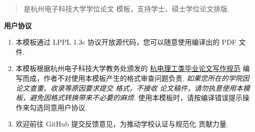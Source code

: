 \begin{abstract}
   是杭州电子科技大学学位论文  模板，支持学士、硕士学位论文排版.
\end{abstract}

\begin{center}
  \small\bfseries 用户协议
\end{center}
\begin{enumerate} [ itemsep = 0pt ] \small
  \item 本模板通过 LPPL 1.3c 协议开放源代码，您可以随意使用编译出的 PDF 文件.
  \item 本模板根据杭州电子科技大学教务处颁发的 \href{https://jwc.hdu.edu.cn/2022/0428/c4528a153813/page.htm}{杭电理工类毕业论文写作规范} 编写而成，作者不对使用本模板产生的格式审查问题负责. \emph{如果您所在的学院因论文查重、收录等原因要求提交  格式，不接收  论文稿件，请勿执意使用本模板，避免因格式转换带来不必要的麻烦.} 使用本模板时，请按编译错误提示操作来勾选同意用户协议.
  \item 欢迎前往 GitHub 提交反馈意见，为推动学校认证与规范化  贡献力量.
\end{enumerate}